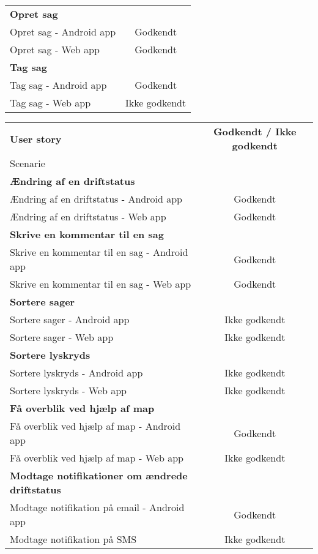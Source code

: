 \begin{tabular}{ l | c  }
			\textbf{Opret sag} & \\
			Opret sag - Android app & Godkendt\\
			Opret sag - Web app & Godkendt \\ \hline
			
			\textbf{Tag sag} & \\
			Tag sag - Android app & Godkendt\\
			Tag sag - Web app & Ikke godkendt \\ \hline		
		\end{tabular}
		\pagebreak
	
	\begin{tabular}{ l | c  }
		\textbf{User story}  & \textbf{Godkendt / Ikke godkendt} \\
		Scenarie & \\ \hline
		\textbf{Ændring af en driftstatus} & \\
		Ændring af en driftstatus - Android app & Godkendt\\
		Ændring af en driftstatus - Web app & Godkendt \\ \hline
		
		\textbf{Skrive en kommentar til en sag} & \\
		Skrive en kommentar til en sag - Android app & Godkendt\\
		Skrive en kommentar til en sag - Web app & Godkendt \\ \hline
		
		\textbf{Sortere sager} & \\
		Sortere sager - Android app & Ikke godkendt\\
		Sortere sager - Web app & Ikke godkendt\\ \hline	
		
		\textbf{Sortere lyskryds} & \\
		Sortere lyskryds - Android app & Ikke godkendt\\
		Sortere lyskryds - Web app & Ikke godkendt\\ \hline
		
		\textbf{Få overblik ved hjælp af map} & \\
		Få overblik ved hjælp af map - Android app & Godkendt \\
		Få overblik ved hjælp af map - Web app & Ikke godkendt \\ \hline
		
		\textbf{Modtage notifikationer om ændrede driftstatus} & \\
		Modtage notifikation på email - Android app & Godkendt\\
		Modtage notifikation på SMS & Ikke godkendt\\ \hline
		

\end{tabular}
